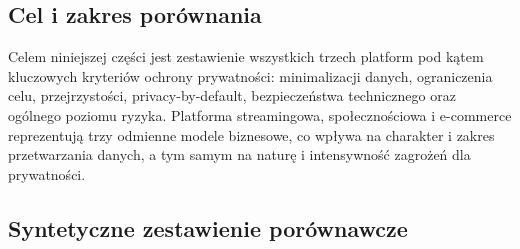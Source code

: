 \documentclass[12pt, a4paper]{article}
\begin{document}
\subsection{Cel i zakres porównania}

Celem niniejszej części jest zestawienie wszystkich trzech platform pod kątem kluczowych kryteriów ochrony prywatności: minimalizacji danych, ograniczenia celu, przejrzystości, privacy-by-default, bezpieczeństwa technicznego oraz ogólnego poziomu ryzyka. Platforma streamingowa, społecznościowa i e-commerce reprezentują trzy odmienne modele biznesowe, co wpływa na charakter i zakres przetwarzania danych, a tym samym na naturę i intensywność zagrożeń dla prywatności.

\subsection{Syntetyczne zestawienie porównawcze}
\end{document}
